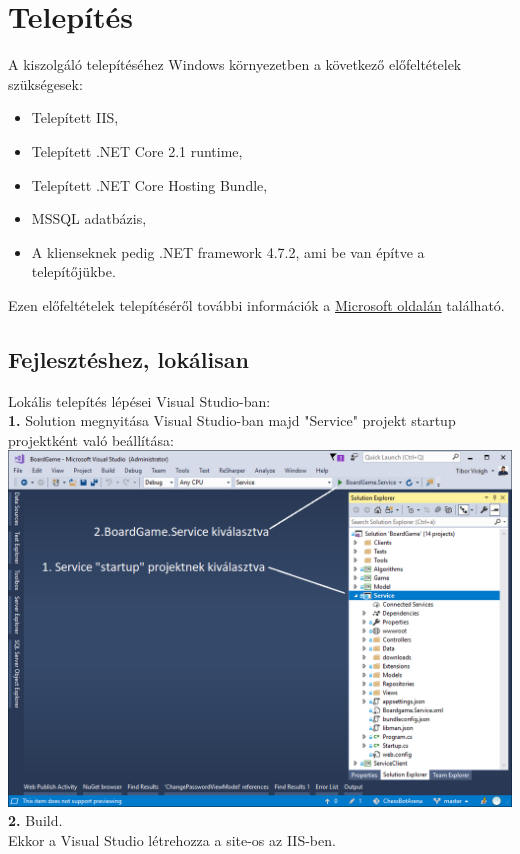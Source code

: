 \documentclass[twoside, a4paper, 12pt]{book}
\begin{document}
\section{Telepítés}
A kiszolgáló telepítéséhez Windows környezetben a következő előfeltételek szükségesek:
\begin{itemize}
	\item Telepített IIS,
	\item Telepített .NET Core 2.1 runtime,
	\item Telepített .NET Core Hosting Bundle,
	\item MSSQL adatbázis,
	\item A klienseknek pedig .NET framework 4.7.2, ami be van építve a telepítőjükbe.
\end{itemize}
Ezen előfeltételek telepítéséről további információk a \href{https://docs.microsoft.com/en-us/aspnet/core/host-and-deploy/iis/?view=aspnetcore-2.2}{Microsoft oldalán} található.
\subsection{Fejlesztéshez, lokálisan}
\noindent Lokális telepítés lépései Visual Studio-ban: \\
\noindent \textbf{1.} Solution megnyitása Visual Studio-ban majd "Service" projekt startup projektként való beállítása: \\
\includegraphics[width=1.0\textwidth]{img/server_dev_run_1.png} \\

\noindent \textbf{2.} Build. \\
Ekkor a Visual Studio létrehozza a site-os az IIS-ben. \\
\end{document}
